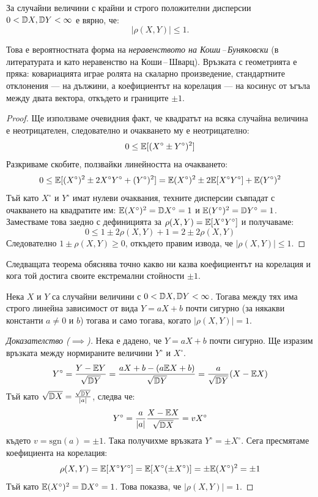 \begin{keythm}\label{thm:corr-bounds}
За случайни величини с крайни и строго положителни дисперсии
$0<\mathbb{D} X,\mathbb{D} Y<\infty$ е вярно, че:
\[
|\rho(X, Y)| \le 1 .
\]
\end{keythm}

Това е вероятностната форма на \emph{неравенството на Коши\,--\,Буняковски} (в
литературата и като неравенство на Коши\,--\,Шварц). Връзката с геометрията е
пряка: ковариацията играе ролята на скаларно произведение, стандартните
отклонения — на дължини, а коефициентът на корелация — на косинус от ъгъла между
двата вектора, откъдето и границите $\pm 1$.
\begin{proof}
Ще използваме очевидния факт, че квадратът на всяка случайна величина е неотрицателен, следователно и очакването му е неотрицателно:
\[
0 \le \mathbb{E}[(X^\circ \pm Y^\circ)^2]
\]
Разкриваме скобите, ползвайки линейността на очакването:
\[
0 \le \mathbb{E}[(X^\circ)^2 \pm 2X^\circ Y^\circ + (Y^\circ)^2] = \mathbb{E}(X^\circ)^2 \pm 2\mathbb{E}[X^\circ Y^\circ] + \mathbb{E}(Y^\circ)^2
\]
Тъй като $X^\circ$ и $Y^\circ$ имат нулеви очаквания, техните дисперсии съвпадат с очакването на квадратите им: $\mathbb{E}(X^\circ)^2 = \mathbb{D} X^\circ = 1$ и $\mathbb{E}(Y^\circ)^2 = \mathbb{D} Y^\circ = 1$. Заместваме това заедно с дефиницията за $\rho(X, Y) = \mathbb{E}[X^\circ Y^\circ]$ и получаваме:
\[
0 \le 1 \pm 2\rho(X, Y) + 1 = 2 \pm 2\rho(X, Y)
\]
Следователно $1 \pm \rho(X, Y) \ge 0$, откъдето правим извода, че $|\rho(X, Y)| \le 1$.
\end{proof}

Следващата теорема обяснява точно какво ни казва коефициентът на корелация и кога той достига своите екстремални стойности $\pm 1$.

\begin{keythm}
Нека $X$ и $Y$ са случайни величини с $0<\mathbb{D} X,\mathbb{D} Y<\infty$. Тогава между тях има
строго линейна зависимост от вида $Y = aX + b$ почти сигурно (за някакви константи
$a \neq 0$ и $b$) тогава и само тогава, когато $|\rho(X, Y)| = 1$.
\end{keythm}

\begin{proof}[Доказателство ($\implies$)]
Нека е дадено, че $Y = aX + b$ почти сигурно. Ще изразим връзката между нормираните величини $Y^\circ$ и $X^\circ$.
\[
Y^\circ = \frac{Y - \mathbb{E} Y}{\sqrt{\mathbb{D} Y}} = \frac{aX + b - (a\mathbb{E} X + b)}{\sqrt{\mathbb{D} Y}} = \frac{a}{\sqrt{\mathbb{D} Y}}(X - \mathbb{E} X)
\]
Тъй като $\sqrt{\mathbb{D} X} = \frac{\sqrt{\mathbb{D} Y}}{|a|}$, следва че:
\[
Y^\circ = \frac{a}{|a|} \frac{X - \mathbb{E} X}{\sqrt{\mathbb{D} X}} = v X^\circ
\]
където $v = \text{sgn}(a) = \pm 1$. Така получихме връзката $Y^\circ = \pm X^\circ$.
Сега пресмятаме коефициента на корелация:
\[
\rho(X, Y) = \mathbb{E}[X^\circ Y^\circ] = \mathbb{E}[X^\circ(\pm X^\circ)] = \pm \mathbb{E}(X^\circ)^2 = \pm 1
\]
Тъй като $\mathbb{E}(X^\circ)^2 = \mathbb{D} X^\circ = 1$. Това показва, че $|\rho(X, Y)| = 1$.
\end{proof}

